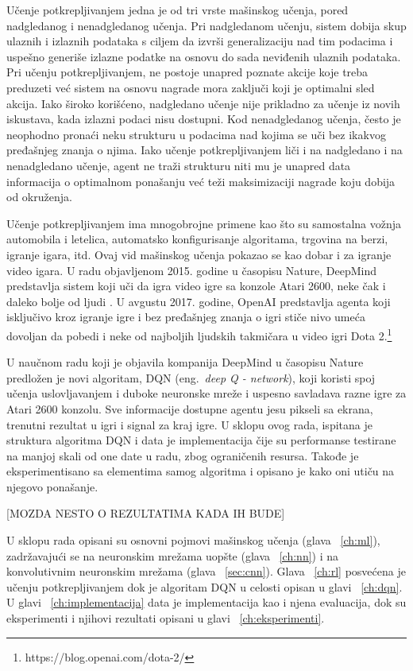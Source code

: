 Učenje potkrepljivanjem jedna je od tri vrste mašinskog učenja, pored nadgledanog i nenadgledanog učenja. Pri nadgledanom učenju, sistem dobija skup ulaznih i izlaznih podataka s ciljem da izvrši generalizaciju nad tim podacima i uspešno generiše izlazne podatke na osnovu do sada neviđenih ulaznih podataka. Pri učenju potkrepljivanjem, ne postoje unapred poznate akcije koje treba preduzeti već sistem na osnovu nagrade mora zaključi koji je optimalni sled akcija. Iako široko korišćeno, nadgledano učenje nije prikladno za učenje iz novih iskustava, kada izlazni podaci nisu dostupni.  Kod nenadgledanog učenja, često je neophodno pronaći neku strukturu u podacima nad kojima se uči bez ikakvog pređašnjeg znanja o njima. Iako učenje potkrepljivanjem liči i na nadgledano i na nenadgledano učenje, agent ne traži strukturu niti mu je unapred data informacija o optimalnom ponašanju već teži maksimizaciji nagrade koju dobija od okruženja. \par


Učenje potkrepljivanjem ima mnogobrojne primene kao što su samostalna vožnja automobila i letelica, automatsko konfigurisanje algoritama, trgovina na berzi, igranje igara, itd. Ovaj vid mašinskog učenja pokazao se kao dobar i za igranje video igara.  U radu objavljenom 2015. godine u časopisu Nature, DeepMind predstavlja sistem koji uči da igra video igre sa konzole Atari 2600, neke čak i daleko bolje od ljudi \cite{dqn_dm}. U avgustu 2017. godine, OpenAI predstavlja agenta koji isključivo kroz igranje igre i bez pređašnjeg znanja o igri stiče nivo umeća dovoljan da pobedi i neke od najboljih ljudskih takmičara u video igri Dota 2.\footnote{https://blog.openai.com/dota-2/} 

U naučnom radu koji je objavila kompanija DeepMind u časopisu Nature predložen je novi algoritam, DQN (eng.~{\em deep Q - network}), koji koristi spoj učenja uslovljavanjem i duboke neuronske mreže i uspesno savladava razne igre za Atari 2600 konzolu. Sve informacije dostupne agentu jesu pikseli sa ekrana, trenutni rezultat u igri i signal za kraj igre.
U sklopu ovog rada, ispitana je struktura algoritma DQN i data je implementacija čije su performanse testirane na manjoj skali od one date u radu, zbog ograničenih resursa. Takođe je eksperimentisano sa elementima samog algoritma i opisano je kako oni utiču na njegovo ponašanje.


[MOZDA NESTO O REZULTATIMA KADA IH BUDE]


U sklopu rada opisani su osnovni pojmovi mašinskog učenja (glava ~\ref{ch:ml}), zadržavajući se na neuronskim mrežama uopšte (glava ~\ref{ch:nn}) i na konvolutivnim neuronskim mrežama (glava ~\ref{sec:cnn}). Glava ~\ref{ch:rl} posvećena je učenju potkrepljivanjem dok je algoritam DQN u celosti opisan u glavi ~\ref{ch:dqn}. U glavi ~\ref{ch:implementacija} data je implementacija kao i njena evaluacija, dok su eksperimenti i njihovi rezultati opisani u glavi ~\ref{ch:eksperimenti}. 